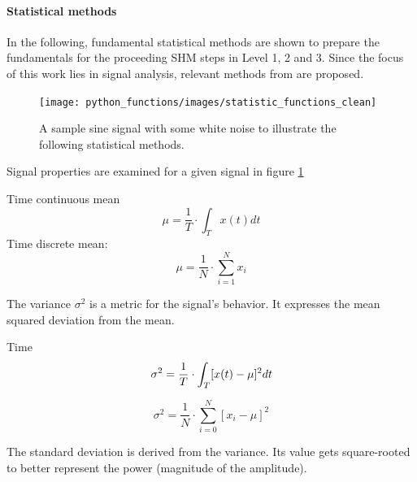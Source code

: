 \paragraph{Statistical methods}
In the following, fundamental statistical methods are shown to prepare the fundamentals for the proceeding SHM steps in Level 1, 2 and 3. Since the focus of this work lies in signal analysis, relevant methods from \textcite{smith_scientist_1999} are proposed.
\begin{figure}[h]
    \centering
    \texttt{[image: python\_functions/images/statistic\_functions\_clean]}
    \caption[Noisy Sine Signal]{A sample sine signal with some white noise to illustrate the following statistical methods.}
    \label{fig:statistics_clean}
\end{figure}

Signal properties are examined for a given signal in figure \ref{fig:statistics_clean}



\cite[S.13-17]{smith_scientist_1999}

Time continuous mean
\begin{equation}
    \label{eq:mean_cont}
    \mu=\frac{1}{T} \cdot \int_T x(t) d t
\end{equation}
Time discrete mean:
\begin{equation}
    \label{eq:mean_disc}
    \mu=\frac{1}{N} \cdot \sum_{i=1}^{N} x_i
\end{equation}




The variance $\sigma^2$ is a metric for the signal's behavior. It expresses the mean squared deviation from the mean.

Time
\begin{equation}
    \label{eq:var_cont}
    \sigma^2=\frac{1}{T} \cdot \int_T[x(t)-\mu]^2 d t\\
\end{equation}

\begin{equation}
    \label{eq:var_disc}
    \sigma^2=\frac{1}{N} \cdot \sum_{i=0}^{N}\left[x_i-\mu\right]^2
\end{equation}

The standard deviation is derived from the variance. Its value gets square-rooted to better represent the power (magnitude of the amplitude).

